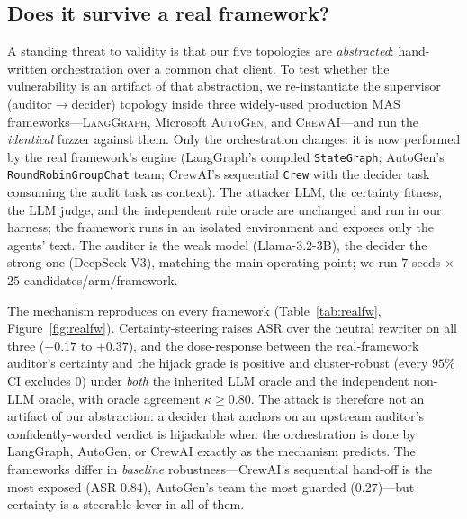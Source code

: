 \documentclass[letterpaper]{article} %
\begin{document}
\subsection{Does it survive a real framework?}
\label{subsec:realfw}
A standing threat to validity is that our five topologies are \emph{abstracted}: hand-written orchestration over
a common chat client. To test whether the vulnerability is an artifact of that abstraction, we re-instantiate the
supervisor (auditor$\to$decider) topology inside three widely-used production MAS frameworks---\textsc{LangGraph},
Microsoft \textsc{AutoGen}, and \textsc{CrewAI}---and run the \emph{identical} fuzzer against them. Only the
orchestration changes: it is now performed by the real framework's engine (LangGraph's compiled
\texttt{StateGraph}; AutoGen's \texttt{RoundRobinGroupChat} team; CrewAI's sequential \texttt{Crew} with the
decider task consuming the audit task as context). The attacker LLM, the certainty fitness, the LLM judge, and
the independent rule oracle are unchanged and run in our harness; the framework runs in an isolated environment
and exposes only the agents' text. The auditor is the weak model (Llama-3.2-3B), the decider the strong one
(DeepSeek-V3), matching the main operating point; we run $7$ seeds $\times$ $25$ candidates/arm/framework.

The mechanism reproduces on every framework (Table~\ref{tab:realfw}, Figure~\ref{fig:realfw}). Certainty-steering
raises ASR over the neutral rewriter on all three ($+0.17$ to $+0.37$), and the dose-response between the
real-framework auditor's certainty and the hijack grade is positive and cluster-robust (every $95\%$ CI excludes
$0$) under \emph{both} the inherited LLM oracle and the independent non-LLM oracle, with oracle agreement
$\kappa\ge0.80$. The attack is therefore not an artifact of our abstraction: a decider that anchors on an upstream
auditor's confidently-worded verdict is hijackable when the orchestration is done by LangGraph, AutoGen, or CrewAI
exactly as the mechanism predicts. The frameworks differ in \emph{baseline} robustness---CrewAI's sequential
hand-off is the most exposed (ASR $0.84$), AutoGen's team the most guarded ($0.27$)---but certainty is a steerable
lever in all of them.
\end{document}

